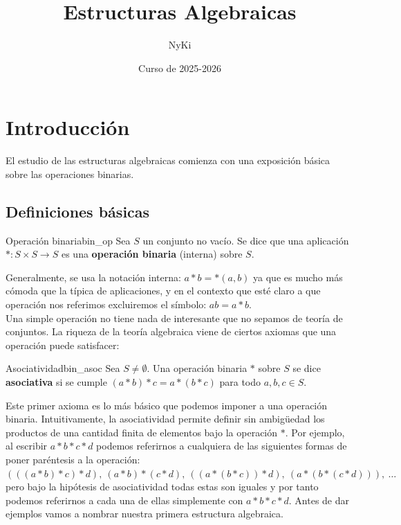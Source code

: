 \documentclass[a4paper]{book}
\author{NyKi}
\title{Estructuras Algebraicas}
\date{Curso de 2025-2026}
\theoremstyle{definition}
\theoremstyle{ejemplo}
\theoremstyle{demostracion}
\begin{document}
\maketitle
\clearpage
\tableofcontents

\pagestyle{fancy}

\chapter{Introducción}

El estudio de las estructuras algebraicas comienza con una exposición básica sobre las operaciones binarias.

\section{Definiciones básicas}

\begin{define}{Operación binaria}{bin_op}
	Sea $S$ un conjunto no vacío. Se dice que una aplicación $* : S \times S \rightarrow S$ es una \textbf{operación binaria} (interna) sobre $S$.
\end{define}

Generalmente, se usa la notación interna: $a*b = *(a, b)$ ya que es mucho más cómoda que la típica de aplicaciones, y en el contexto que esté claro a que operación nos referimos excluiremos el símbolo: $ab = a*b$.\\ 
Una simple operación no tiene nada de interesante que no sepamos de teoría de conjuntos. La riqueza de la teoría algebraica viene de ciertos axiomas que una operación puede satisfacer:


\begin{define}{Asociatividad}{bin_asoc}
	Sea $S \neq \emptyset$. Una operación binaria $*$ sobre $S$ se dice \textbf{asociativa} si se cumple $(a*b)*c = a*(b*c)$ para todo $a,b,c \in S$. 
\end{define}

Este primer axioma es lo más básico que podemos imponer a una operación binaria. Intuitivamente, la asociatividad permite definir sin ambigüedad los productos de una cantidad finita de elementos bajo la operación $*$. Por ejemplo, al escribir $a*b*c*d$ podemos referirnos a cualquiera de las siguientes formas de poner paréntesis a la operación: $(((a*b)*c)*d),\ (a*b)*(c*d),\ ((a*(b*c))*d),\ (a*(b*(c*d))),\ \ldots$ pero bajo la hipótesis de asociatividad todas estas son iguales y por tanto podemos referirnos a cada una de ellas simplemente con $a*b*c*d$. Antes de dar ejemplos vamos a nombrar nuestra primera estructura algebraica.
\end{document}
